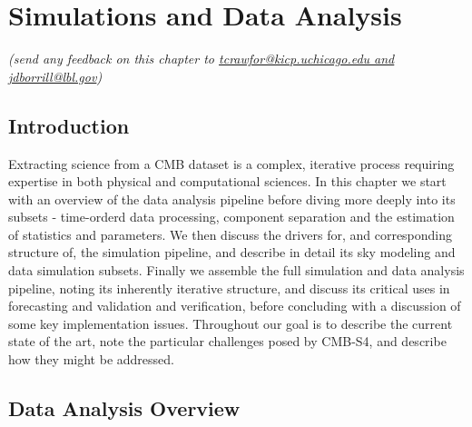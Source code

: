  
\chapter{Simulations and Data Analysis}


\begin{center}
{\it \small (send any feedback on this chapter to \href{mailto:tcrawfor@kicp.uchicago.edu,jdborrill@lbl.gov}{tcrawfor@kicp.uchicago.edu and jdborrill@lbl.gov})}
\end{center}


\section{Introduction}

Extracting science from a CMB dataset is a complex, iterative process requiring expertise in both physical and computational sciences. In this chapter we start with an overview of the data analysis pipeline before diving more deeply into its subsets - time-orderd data processing, component separation and the estimation of statistics and parameters. We then discuss the drivers for, and corresponding structure of, the simulation pipeline, and describe in detail its sky modeling and data simulation subsets. Finally we assemble the full simulation and data analysis pipeline, noting its inherently iterative structure, and discuss its critical uses in forecasting and validation and verification, before concluding with a discussion of some key implementation issues. Throughout our goal is to describe the current state of the art, note the particular challenges posed by CMB-S4, and describe how they might be addressed.

\section{Data Analysis Overview}

